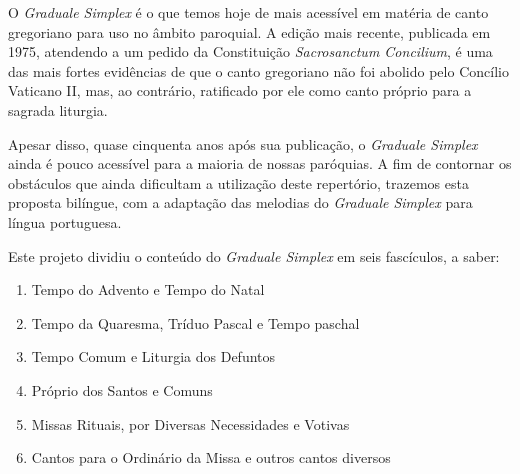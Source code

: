 \newcommand{\GR}{\emph{Graduale Romanum}}
\newcommand{\GS}{\emph{Graduale Simplex}}
\newcommand{\KS}{\emph{Kyriale Simplex}}
\newcommand{\Al}{\emph{Allelúia}}
\newcommand{\Schola}{\emph{schola}}
\newcommand{\ScholaC}{\emph{schola cantorum}}
\newcommand{\FirstPara}[1]{\noindent\textcolor{gregoriocolor}{#1.}}
\newcommand{\Para}[1]{\vspace{\baselineskip}\noindent\textcolor{gregoriocolor}{#1.}}



O {\GS} é o que temos hoje de mais acessível em matéria de canto gregoriano para uso no âmbito paroquial. A edição mais recente, publicada em 1975, atendendo a um pedido da Constituição \emph{Sacrosanctum Concilium}, é uma das mais fortes evidências de que o canto gregoriano não foi abolido pelo Concílio Vaticano II, mas, ao contrário, ratificado por ele como canto próprio para a sagrada liturgia.

Apesar disso, quase cinquenta anos após sua publicação, o {\GS} ainda é pouco acessível para a maioria de nossas paróquias. A fim de contornar os obstáculos que ainda dificultam a utilização deste repertório, trazemos esta proposta bilíngue, com a adaptação das melodias do {\GS} para língua portuguesa.


Este projeto dividiu o conteúdo do {\GS} em seis fascículos, a saber:
\begin{enumerate}[I:]
  \item Tempo do Advento e Tempo do Natal
  \item Tempo da Quaresma, Tríduo Pascal e Tempo paschal
  \item Tempo Comum e Liturgia dos Defuntos
  \item Próprio dos Santos e Comuns
  \item Missas Rituais, por Diversas Necessidades e Votivas
  \item Cantos para o Ordinário da Missa e outros cantos diversos
\end{enumerate}

